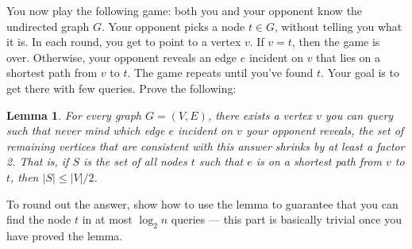\documentclass[10pt]{article}
\newtheorem{lemma}{Lemma}
\begin{document}
You now play the following game: both you and your opponent know the undirected graph $G$. Your opponent picks a node $t \in G$, without telling you what it is. In each round, you get to point to a vertex $v$. If $v=t$, then the game is over. Otherwise, your opponent reveals an edge $e$ incident on $v$ that lies on a shortest path from $v$ to $t$. The game repeats until you've found $t$. Your goal is to get there with few queries.
Prove the following:

\begin{lemma} \label{lem:median}
  For every graph $G=(V,E)$, there exists a vertex $v$ you can query such that never mind which edge $e$ incident on $v$ your opponent reveals, the set of remaining vertices that are consistent with this answer shrinks by at least a factor 2. That is, if $S$ is the set of all nodes $t$ such that $e$ is on a shortest path from $v$ to $t$, then $|S| \leq |V|/2$.
\end{lemma}

To round out the answer, show how to use the lemma to guarantee that you can find the node $t$ in at most $\log_2 n$ queries --- this part is basically trivial once you have proved the lemma.
\end{document}
